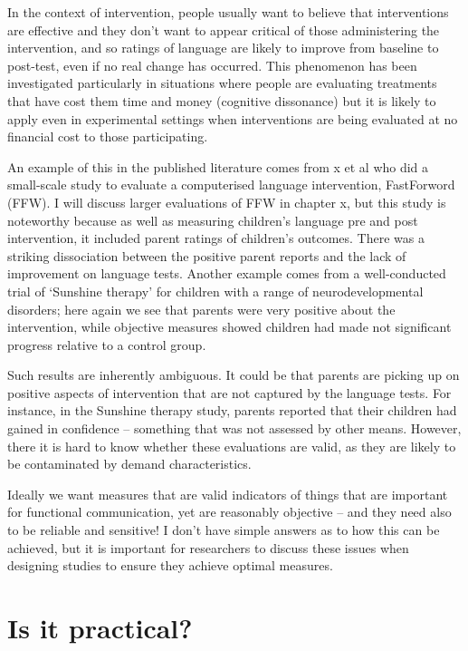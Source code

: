 \documentclass[]{book}
\begin{document}
In the context of intervention, people usually want to believe that interventions are effective and they don't want to appear critical of those administering the intervention, and so ratings of language are likely to improve from baseline to post-test, even if no real change has occurred. This phenomenon has been investigated particularly in situations where people are evaluating treatments that have cost them time and money (cognitive dissonance) but it is likely to apply even in experimental settings when interventions are being evaluated at no financial cost to those participating.

An example of this in the published literature comes from x et al who did a small-scale study to evaluate a computerised language intervention, FastForword (FFW). I will discuss larger evaluations of FFW in chapter x, but this study is noteworthy because as well as measuring children's language pre and post intervention, it included parent ratings of children's outcomes. There was a striking dissociation between the positive parent reports and the lack of improvement on language tests.
Another example comes from a well-conducted trial of `Sunshine therapy' for children with a range of neurodevelopmental disorders; here again we see that parents were very positive about the intervention, while objective measures showed children had made not significant progress relative to a control group.

Such results are inherently ambiguous. It could be that parents are picking up on positive aspects of intervention that are not captured by the language tests. For instance, in the Sunshine therapy study, parents reported that their children had gained in confidence -- something that was not assessed by other means. However, there it is hard to know whether these evaluations are valid, as they are likely to be contaminated by demand characteristics.

Ideally we want measures that are valid indicators of things that are important for functional communication, yet are reasonably objective -- and they need also to be reliable and sensitive! I don't have simple answers as to how this can be achieved, but it is important for researchers to discuss these issues when designing studies to ensure they achieve optimal measures.

\hypertarget{is-it-practical}{%
\section{Is it practical?}\label{is-it-practical}}
\end{document}
